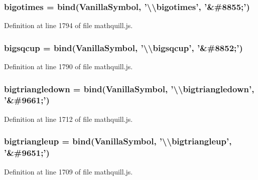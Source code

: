 \subsubsection[{bigotimes}]{ bigotimes = {\bf bind}({\bf Vanilla\-Symbol}, '\textbackslash{}\textbackslash{}bigotimes', '\&\#8855;')}\label{mathquill_8js_a5e0673a615eab26789b45a86a5c455f2}


Definition at line 1794 of file mathquill.\-js.

\subsubsection[{bigsqcup}]{ bigsqcup = {\bf bind}({\bf Vanilla\-Symbol}, '\textbackslash{}\textbackslash{}bigsqcup', '\&\#8852;')}\label{mathquill_8js_a2c5f72733cc08fff39fe275f286a5481}


Definition at line 1790 of file mathquill.\-js.

\subsubsection[{bigtriangledown}]{ bigtriangledown = {\bf bind}({\bf Vanilla\-Symbol}, '\textbackslash{}\textbackslash{}bigtriangledown', '\&\#9661;')}\label{mathquill_8js_a4cead7f6d85f953d6fa191954cd11cc3}


Definition at line 1712 of file mathquill.\-js.

\subsubsection[{bigtriangleup}]{ bigtriangleup = {\bf bind}({\bf Vanilla\-Symbol}, '\textbackslash{}\textbackslash{}bigtriangleup', '\&\#9651;')}\label{mathquill_8js_adba4926978e7496705919699cbd6e8b0}


Definition at line 1709 of file mathquill.\-js.

